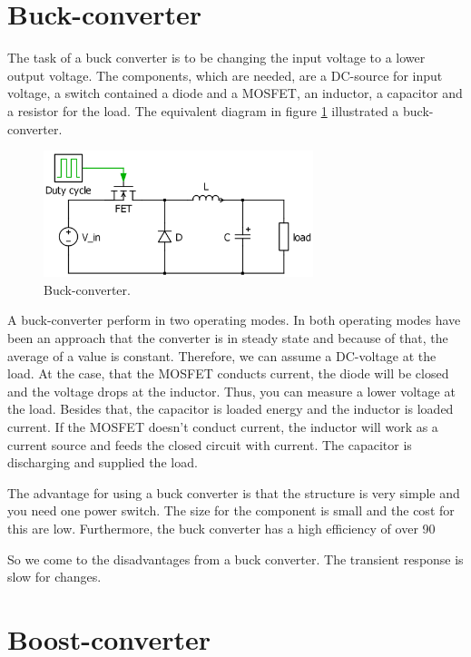 \section{Buck-converter\label{Buck-C}}

The task of a buck converter is to be changing the input voltage to a lower output voltage. The components, which are needed, are a DC-source for input voltage, a switch contained a diode and a MOSFET, an inductor, a capacitor and a resistor for the load. The equivalent diagram in figure \ref{Buck-converter} illustrated a buck-converter.

\begin{figure}[htbp]
	\begin{center}
		\includegraphics[width=0.7\textwidth]{../Pictures/Buck-converter}
		\caption{Buck-converter.}
		\label{Buck-converter}
	\end{center}	
\end{figure}

A buck-converter perform in two operating modes. In both operating modes have been an approach that the converter is in steady state and because of that, the average of a value is constant. Therefore, we can assume a DC-voltage at the load. At the case, that the MOSFET conducts current, the diode will be closed and the voltage drops at the inductor. Thus,  you can measure a lower voltage at the load. Besides that, the capacitor is loaded energy and the inductor is loaded current. If the MOSFET doesn't conduct current, the inductor will work as a current source and feeds the closed circuit with current. The capacitor is discharging and supplied the load.

The advantage for using a buck converter is that the structure is very simple and you need one power switch. The size for the component is small and the cost for this are low. Furthermore, the buck converter has a high efficiency of over 90 %

So we come to the disadvantages from a buck converter. The transient response is slow for changes. 


\section{Boost-converter\label{Boost-C}}

